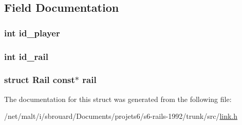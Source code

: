 \subsection{Field Documentation}
\hypertarget{structMy__Rail_a7a793a40560fbe6a7df025a117e93272}{
\subsubsection[{id\-\_\-player}]{\setlength{\rightskip}{0pt plus 5cm}int id\-\_\-player}}\label{structMy__Rail_a7a793a40560fbe6a7df025a117e93272}
\hypertarget{structMy__Rail_a79d06d37269735dfc8b180a8be0fe759}{
\subsubsection[{id\-\_\-rail}]{\setlength{\rightskip}{0pt plus 5cm}int id\-\_\-rail}}\label{structMy__Rail_a79d06d37269735dfc8b180a8be0fe759}
\hypertarget{structMy__Rail_ac3b4b1be4ff56fa71c889afa8c8c7888}{
\subsubsection[{rail}]{\setlength{\rightskip}{0pt plus 5cm}struct {\bf Rail} const$\ast$ rail}}\label{structMy__Rail_ac3b4b1be4ff56fa71c889afa8c8c7888}


The documentation for this struct was generated from the following file\-:\begin{DoxyCompactItemize}
\item 
/net/malt/i/sbrouard/\-Documents/projets6/s6-\/rails-\/1992/trunk/src/\hyperlink{link_8h}{link.\-h}\end{DoxyCompactItemize}
